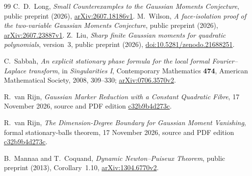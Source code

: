 \documentclass[11pt]{article}
\theoremstyle{definition}\newtheorem{definition}[theorem]{Definition}
\theoremstyle{remark}\newtheorem{remark}[theorem]{Remark}
\begin{document}
\begin{thebibliography}{99}
\small
{}
C.~D.~Long, \emph{Small Counterexamples to the Gaussian Moments Conjecture},
public preprint (2026),
\href{https://arxiv.org/abs/2607.18186v1}{arXiv:2607.18186v1}.
M.~Wilson, \emph{A face-isolation proof of the two-variable Gaussian
Moments Conjecture}, public preprint (2026),
\href{https://arxiv.org/abs/2607.23887v1}{arXiv:2607.23887v1}.
Z.~Liu, \emph{Sharp finite Gaussian moments for quadratic polynomials},
version~3, public preprint (2026),
\href{https://doi.org/10.5281/zenodo.21688251}{doi:10.5281/zenodo.21688251}.

C.~Sabbah, \emph{An explicit stationary phase formula for the local
formal Fourier--Laplace transform}, in \emph{Singularities I},
Contemporary Mathematics \textbf{474}, American Mathematical Society,
2008, 309--330;
\href{https://arxiv.org/abs/0706.3570v2}{arXiv:0706.3570v2}.

R.~van Rijn, \emph{Gaussian Marker Reduction with a Constant Quadratic
Fibre}, 17 November 2026, source and PDF edition
\href{https://github.com/royvanrijn/jacobian-research/tree/c32b9b4d273cf7988e85184a0d5eae9c488727fd/unpublished/gaussian-constant-fibre-base-marker-certificates}{c32b9b4d273c}.

R.~van Rijn, \emph{The Dimension-Degree Boundary for Gaussian Moment
Vanishing}, formal stationary-balls theorem, 17 November 2026,
source and PDF edition
\href{https://github.com/royvanrijn/jacobian-research/tree/c32b9b4d273cf7988e85184a0d5eae9c488727fd/unpublished/gaussian-boundary}{c32b9b4d273c}.

B.~Mannaa and T.~Coquand, \emph{Dynamic Newton--Puiseux Theorem},
public preprint (2013), Corollary~1.10,
\href{https://arxiv.org/abs/1304.6770v2}{arXiv:1304.6770v2}.

\end{thebibliography}
\end{document}
